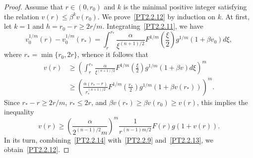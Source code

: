 \documentclass[11pt]{amsart}
\theoremstyle{definition}
\numberwithin{equation}{section}
\begin{document}
\begin{proof}
Assume that $r \in (0, r_0)$ and $k$ is the minimal positive integer satisfying the relation $v (r) \le \beta^k v (r_0)$. 
We prove~\eqref{PT2.2.12} by induction on $k$.
At first, let $k = 1$ and $h = r_0 - r \ge 2 r / m$.
Integrating~\eqref{PT2.2.11}, we have
$$
	v_0^{1 / m} (r) - v_0^{1 / m} (r_*)
	=
	\int_r^{r_*}
	\frac{
		\alpha
	}{
		\xi^{(n + 1) / 2}
	}
	F^{1 / m} 
	\left(
		\frac{\xi}{2}
	\right)
	g^{1 / m} (1 + \beta v_0)
	d\xi,
$$
where $r_* = \min \{r_0, 2 r \}$,
whence it follows that
\begin{align*}
	v (r)
	&
	{}
	\ge
	\left(
		\int_r^{r_*}
		\frac{
			\alpha
		}{
			\xi^{(n + 1) / 2}
		}
		F^{1 / m} 
		\left(
			\frac{\xi}{2}
		\right)
		g^{1 / m} (1 + \beta v)
		d\xi
	\right)^m
	\\
	&
	{}
	\ge
	\left(
		\frac{
			\alpha 
			(r_* - r)
		}{
			r_*^{(n + 1) / 2}
		}
		F^{1 / m} 
		\left(
			\frac{r_*}{2}
		\right)
		g^{1 / m} (1 + \beta v (r_*))
	\right)^m.	
\end{align*}
Since $r_* - r \ge 2 r / m$, $r_* \le  2 r$, and $\beta v (r_*) \ge \beta v (r_0) \ge v (r)$, this implies the inequality
\begin{equation}
	v (r)
	\ge
	\left(
		\frac{
			\alpha
		}{
			2^{(n - 1) / 2}
			m
		}
	\right)^m
	\frac{
		1
	}{
		r^{(n - 1) m / 2}
	}
	F (r)
	g (1 + v (r)).
	\label{PT2.2.14}
\end{equation}
In its turn, combining~\eqref{PT2.2.14} with~\eqref{PT2.2.9} and~\eqref{PT2.2.13}, we obtain~\eqref{PT2.2.12}.


\end{proof}
\end{document}
